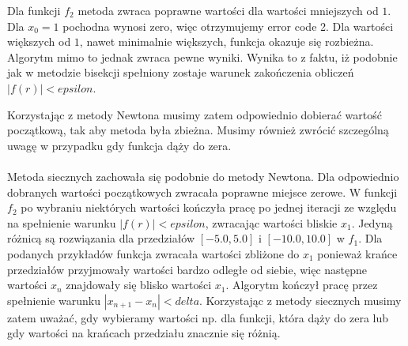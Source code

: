 \documentclass[12pt]{article}
\begin{document}
Dla funkcji $f_2$ metoda zwraca poprawne wartości dla wartości mniejszych od $1$. Dla $x_0=1$ pochodna wynosi zero, więc otrzymujemy error code 2. Dla wartości większych od $1$, nawet minimalnie większych, funkcja okazuje się rozbieżna. Algorytm mimo to jednak zwraca pewne wyniki. Wynika to z faktu, iż podobnie jak w metodzie bisekcji spełniony zostaje warunek zakończenia obliczeń $|f(r)| < epsilon$.

Korzystając z metody Newtona musimy zatem odpowiednio dobierać wartość początkową, tak aby metoda była zbieżna. Musimy również zwrócić szczególną uwagę w przypadku gdy funkcja dąży do zera.
\\
\\
\indent Metoda siecznych zachowała się podobnie do metody Newtona. Dla odpowiednio dobranych wartości początkowych zwracała poprawne miejsce zerowe. W funkcji $f_2$ po wybraniu niektórych wartości kończyła pracę po jednej iteracji ze względu na spełnienie warunku $|f(r)| < epsilon$, zwracając wartości bliskie $x_1$. Jedyną różnicą są rozwiązania dla przedziałów $[-5.0, 5.0]$ i $[-10.0, 10.0]$ w $f_1$. Dla podanych przykładów funkcja zwracała wartości zbliżone do $x_1$ ponieważ krańce przedziałów przyjmowały wartości bardzo odległe od siebie, więc następne wartości $x_n$ znajdowały się blisko wartości $x_1$. Algorytm kończył pracę przez spełnienie warunku $|x_{n+1}-x_n| < delta$. Korzystając z metody siecznych musimy zatem uważać, gdy wybieramy wartości np. dla funkcji, która dąży do zera lub gdy wartości na krańcach przedziału znacznie się różnią.
\end{document}

